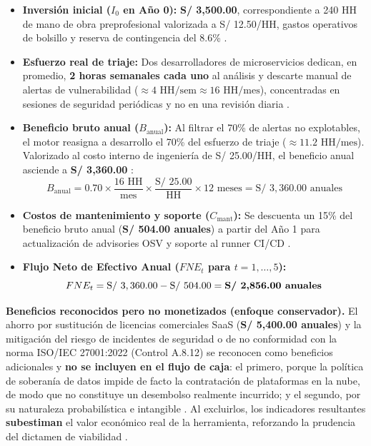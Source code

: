 \begin{itemize}[leftmargin=1.27cm]
    \item \textbf{Inversión inicial ($I_0$ en Año 0):} \textbf{S/ 3,500.00}, correspondiente a 240 HH de mano de obra preprofesional valorizada a S/ 12.50/HH, gastos operativos de bolsillo y reserva de contingencia del 8.6\% \parencite{torres2026proyecto}. %
    \item \textbf{Esfuerzo real de triaje:} Dos desarrolladores de microservicios dedican, en promedio, \textbf{2 horas semanales cada uno} al análisis y descarte manual de alertas de vulnerabilidad ($\approx 4\text{ HH/sem} \approx 16\text{ HH/mes}$), concentradas en sesiones de seguridad periódicas y no en una revisión diaria \parencite{torres2026proyecto}. %
    \item \textbf{Beneficio bruto anual ($B_{\text{anual}}$):} Al filtrar el 70\% de alertas no explotables, el motor reasigna a desarrollo el 70\% del esfuerzo de triaje ($\approx 11.2\text{ HH/mes}$). Valorizado al costo interno de ingeniería de S/ 25.00/HH, el beneficio anual asciende a \textbf{S/ 3,360.00} \parencite{pashchenko2022vuln4real}:
    \begin{equation}
        B_{\text{anual}} = 0.70 \times \frac{16\text{ HH}}{\text{mes}} \times \frac{\text{S/ } 25.00}{\text{HH}} \times 12\text{ meses} = \text{S/ } 3,360.00\text{ anuales}
    \end{equation}
    \item \textbf{Costos de mantenimiento y soporte ($C_{\text{mant}}$):} Se descuenta un 15\% del beneficio bruto anual (\textbf{S/ 504.00 anuales}) a partir del Año 1 para actualización de advisories OSV y soporte al runner CI/CD \parencite{humble2010continuous, torres2026proyecto}. %
    \item \textbf{Flujo Neto de Efectivo Anual ($FNE_t$ para $t = 1, \dots, 5$):}
    \begin{equation}
        FNE_t = \text{S/ } 3,360.00 - \text{S/ } 504.00 = \text{\textbf{S/ 2,856.00 anuales}}
    \end{equation}
\end{itemize}

\textbf{Beneficios reconocidos pero no monetizados (enfoque conservador).} El ahorro por sustitución de licencias comerciales SaaS (\textbf{S/ 5,400.00 anuales}) y la mitigación del riesgo de incidentes de seguridad o de no conformidad con la norma ISO/IEC 27001:2022 (Control A.8.12) se reconocen como beneficios adicionales y \textbf{no se incluyen en el flujo de caja}: el primero, porque la política de soberanía de datos impide de facto la contratación de plataformas en la nube, de modo que no constituye un desembolso realmente incurrido; y el segundo, por su naturaleza probabilística e intangible \parencite{ladisa2023sok, gutierrez2024auditoria}. %
Al excluirlos, los indicadores resultantes \textbf{subestiman} el valor económico real de la herramienta, reforzando la prudencia del dictamen de viabilidad \parencite{torres2026proyecto}. %

